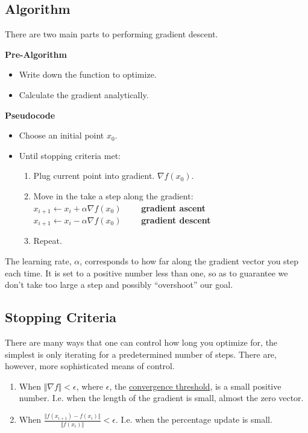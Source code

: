 \documentclass[a4paper, 12pt]{article}
\begin{document}
\subsection*{Algorithm}

\vspace{0.5pc}
There are two main parts to performing gradient descent.
\vspace{0.5pc}

\textbf{Pre-Algorithm}

\begin{itemize}
  \item Write down the function to optimize.
  \item Calculate the gradient analytically.
\end{itemize}

\textbf{Pseudocode}

\begin{itemize}
  \item Choose an initial point $x_0$.
  \item Until stopping criteria met:
    \begin{enumerate}
      \item Plug current point into gradient. $\nabla f(x_0)$.
      \item Move in the take a step along the gradient: \\
        \quad \textbullet \; $x_{i+1} \leftarrow x_i + \alpha \nabla f(x_0) \qquad$ \textbf{gradient ascent} \\
        \quad \textbullet \; $x_{i+1} \leftarrow x_i - \alpha \nabla f(x_0) \qquad$ \textbf{gradient descent}
      \item Repeat.
    \end{enumerate}
\end{itemize}

The learning rate, $\alpha$, corresponds to how far along the gradient vector you step each time. It is set to a positive number less than one, so as to guarantee we don't take too large a step and possibly ``overshoot'' our goal.

\subsection*{Stopping Criteria}
There are many ways that one can control how long you optimize for, the simplest is only iterating for a predetermined number of steps. There are, however, more sophisticated means of control.

\begin{enumerate}
  \item When $\Vert \nabla f \Vert < \epsilon$, where $\epsilon$, the \underline{convergence threshold}, is a small positive number. I.e. when the length of the gradient is small, almost the zero vector.
  \item When $\frac{\Vert f(x_{i+1}) - f(x_i) \Vert}{\Vert f(x_i) \Vert} < \epsilon$. I.e. when the percentage update is small.
\end{enumerate}
\end{document}
